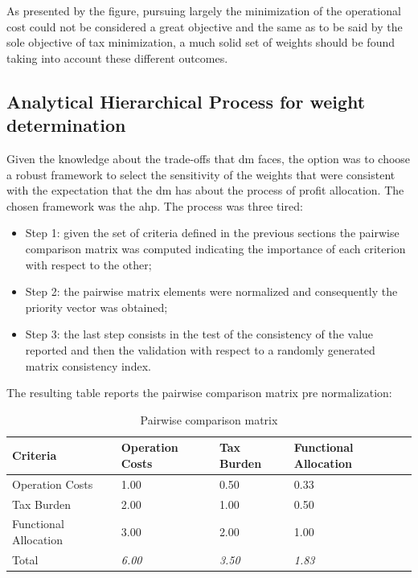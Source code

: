 \begin{doublespace}
As presented by the figure, pursuing largely the minimization of the operational cost could not be considered a great objective and the same as to be said by the sole objective of tax minimization, a much solid set of weights should be found taking into account these different outcomes.

\subsection{Analytical Hierarchical Process for weight determination}
Given the knowledge about the trade-offs that \gls{dm} faces, the option was to choose a robust framework to select the sensitivity of the weights that were consistent with the expectation that the \gls{dm} has about the process of profit allocation. The chosen framework was the \gls{ahp}\cite{Saaty1980}. The process was three tired:

\begin{itemize}
    \item Step 1: given the set of criteria defined in the previous sections the pairwise comparison matrix was computed indicating the importance of each criterion with respect to the other;
    \item Step 2: the pairwise matrix elements were normalized and consequently the priority vector was obtained;
    \item Step 3: the last step consists in the test of the consistency of the value reported and then the validation with respect to a randomly generated matrix consistency index.
\end{itemize}

The resulting table reports the pairwise comparison matrix pre normalization:

\begin{table}[ht]
\centering
\begin{tabular}{@{}llll@{}}
\toprule
\textbf{Criteria}     & Operation Costs & Tax Burden    & Functional Allocation \\ \midrule
Operation Costs       & 1.00            & 0.50          & 0.33                  \\
Tax Burden            & 2.00            & 1.00          & 0.50                  \\
Functional Allocation & 3.00            & 2.00          & 1.00                  \\
Total                 & \textit{6.00}   & \textit{3.50} & \textit{1.83}         \\ \bottomrule
\end{tabular}
\caption{Pairwise comparison matrix}
\end{table}


\end{doublespace}
